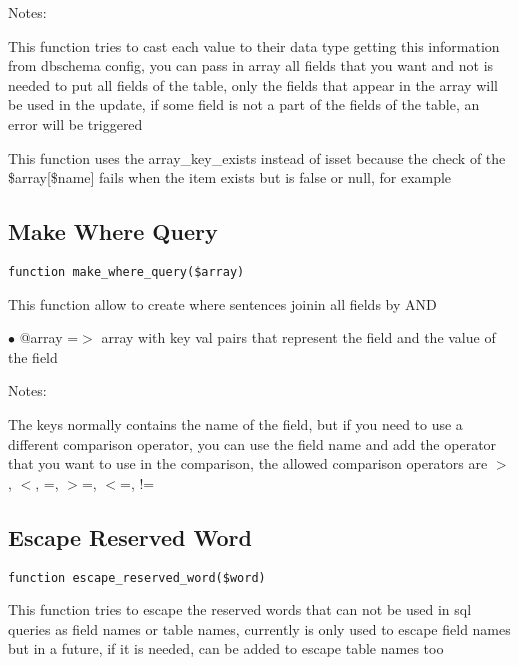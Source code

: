 \documentclass[a4paper]{book}
\begin{document}
Notes:

This function tries to cast each value to their data type getting this
information from dbschema config, you can pass in array all fields that
you want and not is needed to put all fields of the table, only the
fields that appear in the array will be used in the update, if some
field is not a part of the fields of the table, an error will be
triggered

This function uses the array\_key\_exists instead of isset because the
check of the \$array[\$name] fails when the item exists but is false or
null, for example

\hypertarget{toc260}{}
\subsection{Make Where Query}

\begin{lstlisting}
function make_where_query($array)
\end{lstlisting}

This function allow to create where sentences joinin all fields by AND

\begin{compactitem}
\item[\color{myblue}$\bullet$] @array =$>$ array with key val pairs that represent the field and the value of
          the field
\end{compactitem}

Notes:

The keys normally contains the name of the field, but if you need to use
a different comparison operator, you can use the field name and add the
operator that you want to use in the comparison, the allowed comparison
operators are $>$, $<$, =, $>$=, $<$=, !=

\hypertarget{toc261}{}
\subsection{Escape Reserved Word}

\begin{lstlisting}
function escape_reserved_word($word)
\end{lstlisting}

This function tries to escape the reserved words that can not be used
in sql queries as field names or table names, currently is only used
to escape field names but in a future, if it is needed, can be added
to escape table names too
\end{document}

